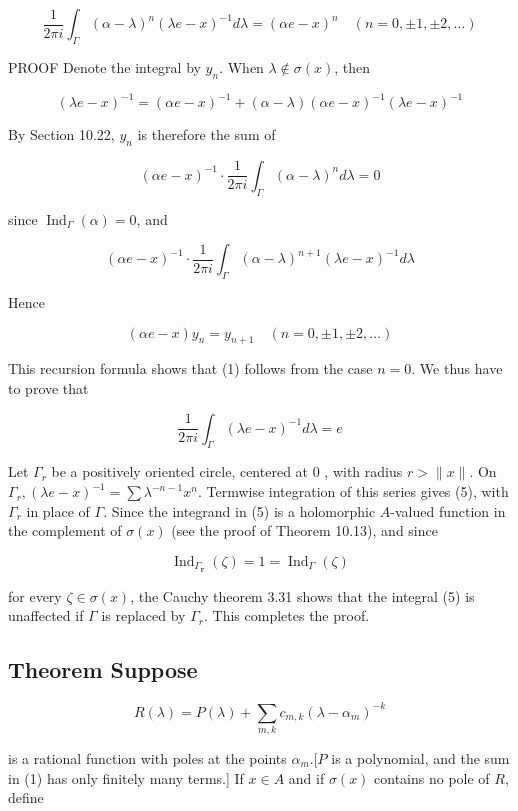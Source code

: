 \documentclass[10pt]{article}
\begin{document}
$$
\frac{1}{2 \pi i} \int_{\Gamma}(\alpha-\lambda)^{n}(\lambda e-x)^{-1} d \lambda=(\alpha e-x)^{n} \quad(n=0, \pm 1, \pm 2, \ldots)
$$

PROOF Denote the integral by $y_{n}$. When $\lambda \notin \sigma(x)$, then

$$
(\lambda e-x)^{-1}=(\alpha e-x)^{-1}+(\alpha-\lambda)(\alpha e-x)^{-1}(\lambda e-x)^{-1}
$$

By Section 10.22, $y_{n}$ is therefore the sum of

$$
(\alpha e-x)^{-1} \cdot \frac{1}{2 \pi i} \int_{\Gamma}(\alpha-\lambda)^{n} d \lambda=0
$$

since $\operatorname{Ind}_{\Gamma}(\alpha)=0$, and

$$
(\alpha e-x)^{-1} \cdot \frac{1}{2 \pi i} \int_{\Gamma}(\alpha-\lambda)^{n+1}(\lambda e-x)^{-1} d \lambda
$$

Hence

$$
(\alpha e-x) y_{n}=y_{n+1} \quad(n=0, \pm 1, \pm 2, \ldots)
$$

This recursion formula shows that (1) follows from the case $n=0$. We thus have to prove that

$$
\frac{1}{2 \pi i} \int_{\Gamma}(\lambda e-x)^{-1} d \lambda=e
$$

Let $\Gamma_{r}$ be a positively oriented circle, centered at 0 , with radius $r>\|x\|$. On $\Gamma_{r},(\lambda e-x)^{-1}=\sum \lambda^{-n-1} x^{n}$. Termwise integration of this series gives (5), with $\Gamma_{r}$ in place of $\Gamma$. Since the integrand in (5) is a holomorphic $A$-valued function in the complement of $\sigma(x)$ (see the proof of Theorem 10.13), and since

$$
\operatorname{Ind}_{\Gamma_{\mathbf{r}}}(\zeta)=1=\operatorname{Ind}_{\Gamma}(\zeta)
$$

for every $\zeta \in \sigma(x)$, the Cauchy theorem 3.31 shows that the integral (5) is unaffected if $\Gamma$ is replaced by $\Gamma_{r}$. This completes the proof.

\subsection{Theorem Suppose}
$$
R(\lambda)=P(\lambda)+\sum_{m, k} c_{m, k}\left(\lambda-\alpha_{m}\right)^{-k}
$$

is a rational function with poles at the points $\alpha_{m} .[P$ is a polynomial, and the sum in (1) has only finitely many terms.] If $x \in A$ and if $\sigma(x)$ contains no pole of $R$, define
\end{document}
